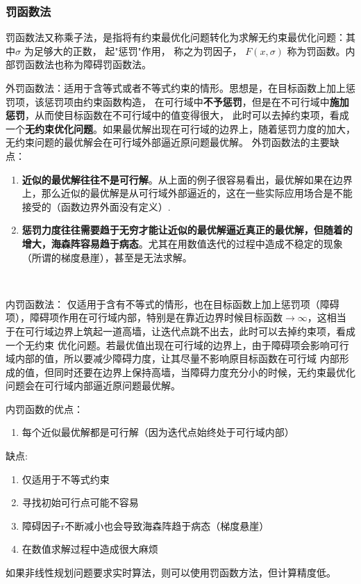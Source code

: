 \documentclass[11pt,a4paper]{ctexart}
\begin{document}
\subsubsection{罚函数法}
罚函数法又称乘子法，是指将有约束最优化问题转化为求解无约束最优化问题：其中$\sigma$ 为足够大的正数， 起"惩罚"作用， 称之为罚因子， $F(x, \sigma )$ 称为罚函数。内部罚函数法也称为障碍罚函数法。
\par
外罚函数法：适用于含等式或者不等式约束的情形。思想是，在目标函数上加上惩罚项，该惩罚项由约束函数构造，
在可行域中\textbf{不予惩罚}，但是在不可行域中\textbf{施加惩罚}，从而使目标函数在不可行域中的值变得很大，
此时可以去掉约束项，看成一个\textbf{无约束优化问题}。如果最优解出现在可行域的边界上，随着惩罚力度的加大，无约束问题的最优解会在可行域外部逼近原问题最优解。
外罚函数法的主要缺点：
\begin{enumerate}
  \item \textbf{近似的最优解往往不是可行解}。从上面的例子很容易看出，最优解如果在边界上，那么近似的最优解是从可行域外部逼近的，这在一些实际应用场合是不能接受的（函数边界外面没有定义）.
  \item \textbf{惩罚力度往往需要趋于无穷才能让近似的最优解逼近真正的最优解，但随着的增大，海森阵容易趋于病态}。尤其在用数值迭代的过程中造成不稳定的现象（所谓的梯度悬崖），甚至是无法求解。
\end{enumerate}
~\\
\par
内罚函数法：
仅适用于含有不等式的情形，也在目标函数上加上惩罚项（障碍项），障碍项作用在可行域内部，特别是在靠近边界时候目标函数$\rightarrow \infty$，这相当于在可行域边界上筑起一道高墙，让迭代点跳不出去，此时可以去掉约束项，看成一个无约束
优化问题。若最优值出现在可行域的边界上，由于障碍项会影响可行域内部的值，所以要减少障碍力度，让其尽量不影响原目标函数在可行域
内部形成的值，但同时还要在边界上保持高墙，当障碍力度充分小的时候，无约束最优化问题会在可行域内部逼近原问题最优解。
\par
内罚函数的优点：
\begin{enumerate}
  \item 每个近似最优解都是可行解（因为迭代点始终处于可行域内部）
\end{enumerate}
缺点:
\begin{enumerate}
  \item 仅适用于不等式约束
  \item 寻找初始可行点可能不容易
  \item 障碍因子r不断减小也会导致海森阵趋于病态（梯度悬崖）
  \item 在数值求解过程中造成很大麻烦
\end{enumerate}
如果非线性规划问题要求实时算法，则可以使用罚函数方法，但计算精度低。
\end{document}
